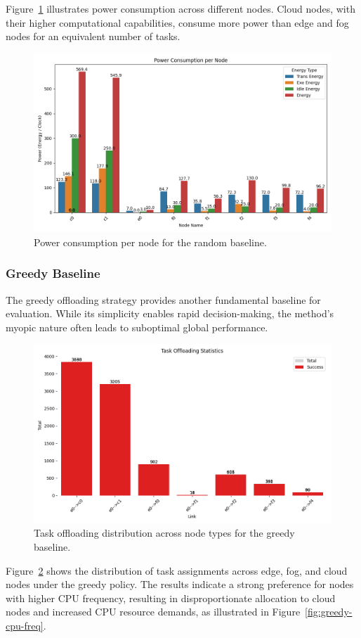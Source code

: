 \documentclass[preprint,3p,authoryear]{elsarticle}
\begin{document}
Figure~\ref{fig:random-power-consumption} illustrates power consumption across different nodes. Cloud nodes, with their higher computational capabilities, consume more power than edge and fog nodes for an equivalent number of tasks.

\begin{figure}[H]
    \centering
    \includegraphics[width=0.5\linewidth]{figs/Random/power_consumption_per_node.png}
    \caption{Power consumption per node for the random baseline.}
    \label{fig:random-power-consumption}
\end{figure}


\subsubsection{Greedy Baseline}
\label{subsec:greedy-baseline}

The greedy offloading strategy provides another fundamental baseline for evaluation. While its simplicity enables rapid decision-making, the method's myopic nature often leads to suboptimal global performance.

\begin{figure}[H]
    \centering
    \includegraphics[width=0.5\linewidth]{figs/Greedy/task_offloading_statistics.png}
    \caption{Task offloading distribution across node types for the greedy baseline.}
    \label{fig:greedy-task-offloading-stats}
\end{figure}

Figure~\ref{fig:greedy-task-offloading-stats} shows the distribution of task assignments across edge, fog, and cloud nodes under the greedy policy. The results indicate a strong preference for nodes with higher CPU frequency, resulting in disproportionate allocation to cloud nodes and increased CPU resource demands, as illustrated in Figure~\ref{fig:greedy-cpu-freq}.
\end{document}
